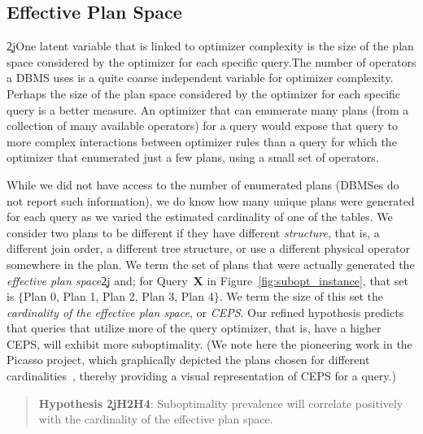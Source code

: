 \subsection{Effective Plan Space}\label{sec:ceps}
\c2j{One latent variable that is linked to optimizer complexity is the
  size of the plan space considered by the optimizer for each specific query.}{The number of operators a DBMS uses is a quite coarse independent variable
for optimizer complexity. Perhaps the size of the plan space considered by
the optimizer for each specific query is a better measure.} An optimizer that
can enumerate many plans (from a collection of many available operators) for
a query would expose that query to more complex interactions between
optimizer rules than a query for which the optimizer that enumerated just a
few plans, using a small set of operators.

While we did not have access to the number of enumerated plans (DBMSes do
not report such information), we do know how many unique plans were
generated for each query as we varied the estimated cardinality of one of
the tables. We consider two plans to be
different if they have different {\em structure}, that is, a different join
order, a different tree structure, or use a different physical operator
somewhere in the plan. We term the set of plans that were actually generated the {\em
  effective plan space}\c2j{ and}{; for Query~{\bf X} in
Figure~\ref{fig:subopt_instance}, that set is 
$\{$Plan 0, Plan 1, Plan 2, Plan 3, Plan 4$\}$.  We} term the size of this set
the {\em cardinality of the effective plan space}, or {\em CEPS}. Our
refined hypothesis predicts that queries that utilize more of the query
optimizer, that is, have a higher CEPS, will exhibit more suboptimality.
(We note here the pioneering work in the Picasso project,
which graphically depicted the plans chosen for
different cardinalities~\cite{harish07,reddy05},
thereby providing a visual representation of CEPS for a query.)

\begin{quote}
{\bf Hypothesis \c2j{H2}{H4}}: Suboptimality prevalence will correlate positively
with the cardinality of the effective plan space.
\end{quote}

